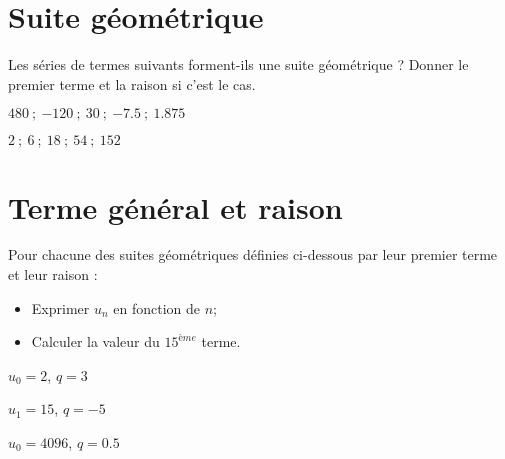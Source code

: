 	\section{Suite géométrique}
	Les séries de termes suivants forment-ils une suite géométrique ? Donner le premier terme et la raison si c'est le cas.
	\begin{questions}
		
	
		\question[2] $\num{480} \: ; \: \num{-120} \: ; \: \num{30}  \: ; \:  \num{-7.5} \: ; \: \num{1.875}$ 
		\fillwithdottedlines{3cm}
		
		\question[2] $\num{2} \: ; \:  \num{6} \: ; \: \num{18} \: ; \: \num{54} \: ; \: \num{152}$%
		\fillwithdottedlines{3cm}
		
	\end{questions}
	
	
\section{Terme général et raison}

Pour chacune des suites géométriques définies ci-dessous par leur premier terme et leur raison :
\begin{itemize}
	\item Exprimer $u_n$ en fonction de $n$;
	\item Calculer la valeur du $15^{ème}$ terme.
\end{itemize} 
\begin{questions}

	
	\question[2] $u_0 = 2$, $q= 3$
	
	\fillwithdottedlines{6cm}
	
	
	\question[2] $u_1 = 15$, $q= -5$
	
	\fillwithdottedlines{6cm}
	
	\question[2] $u_0 = 4096$, $q=\num{0.5}$
	
	\fillwithdottedlines{6cm}
\end{questions}

